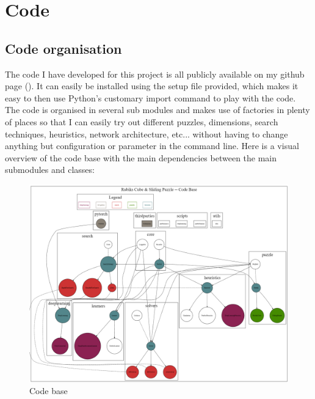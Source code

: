 
\chapter{Code} %

\label{Chapter3} %


\section{Code organisation}

The code I have developed for this project is all publicly available on my github page (\cite{FB}). It can easily be installed using the setup file provided, which makes it easy to then use Python's customary import command to play with the code.
The code is organised in several sub modules and makes use of factories in plenty of places so that I can easily try out different puzzles, dimensions, search techniques, heuristics, network architecture, etc... without having to change anything but configuration or parameter in the command line. Here is a visual overview of the code base with the main dependencies between the main submodules and classes:

\begin{landscape}
\begin{figure}[H]
\centering
\includegraphics[scale=0.5]{./Figures/codebase}
\caption[Codebase]{Code base}
\label{fig:Codebase}
\end{figure}
\end{landscape}


